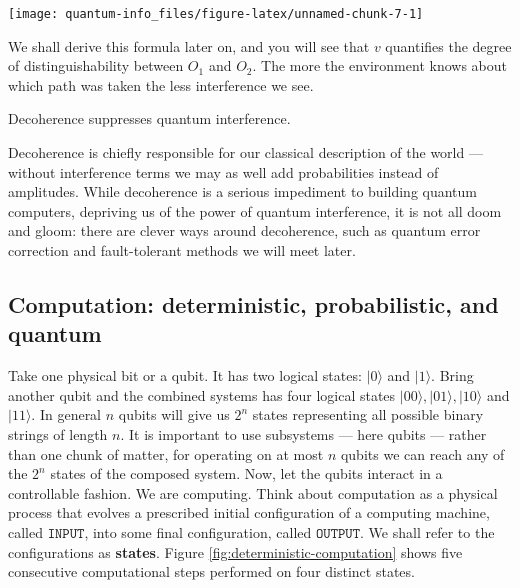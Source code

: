 \documentclass{article}
\newenvironment{idea}%
{\bigskip\noindent\begin{minipage}{\textwidth}\smallskip\begin{tcolorbox}[colback=gray!10,boxrule=0.01mm]}%
{\end{tcolorbox}\end{minipage}\bigskip}
\begin{document}
\begin{center}\texttt{[image: quantum-info\_files/figure-latex/unnamed-chunk-7-1]} \end{center}

We shall derive this formula later on, and you will see that \(v\) quantifies the degree of distinguishability between \(O_1\) and \(O_2\).
The more the environment knows about which path was taken the less interference we see.

\begin{idea}

Decoherence suppresses quantum interference.

\end{idea}

Decoherence is chiefly responsible for our classical description of the world --- without interference terms we may as well add probabilities instead of amplitudes.
While decoherence is a serious impediment to building quantum computers, depriving us of the power of quantum interference, it is not all doom and gloom: there are clever ways around decoherence, such as quantum error correction and fault-tolerant methods we will meet later.

\hypertarget{computation-deterministic-probabilistic-and-quantum}{%
\subsection{Computation: deterministic, probabilistic, and quantum}\label{computation-deterministic-probabilistic-and-quantum}}

Take one physical bit or a qubit.
It has two logical states: \(|0\rangle\) and \(|1\rangle\).
Bring another qubit and the combined systems has four logical states \(|00\rangle, |01\rangle,|10\rangle\) and \(|11\rangle\).
In general \(n\) qubits will give us \(2^n\) states representing all possible binary strings of length \(n\).
It is important to use subsystems --- here qubits --- rather than one chunk of matter, for operating on at most \(n\) qubits we can reach any of the \(2^n\) states of the composed system.
Now, let the qubits interact in a controllable fashion.
We are computing.
Think about computation as a physical process that evolves a prescribed initial configuration of a computing machine, called \textbf{\(\texttt{INPUT}\)}, into some final configuration, called \textbf{\(\texttt{OUTPUT}\)}.
We shall refer to the configurations as \textbf{states}.
Figure \ref{fig:deterministic-computation} shows five consecutive computational steps performed on four distinct states.
\end{document}
